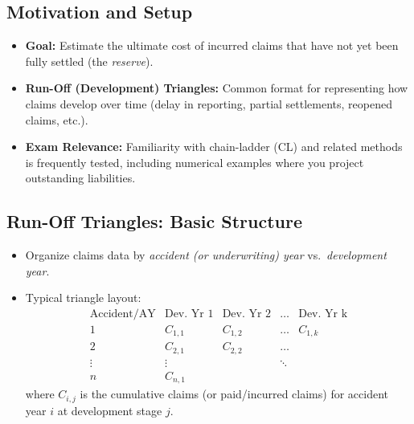 \documentclass[13pt,a4paper]{article}
\begin{document}
\subsection{Motivation and Setup}
\begin{itemize}
  \item \textbf{Goal:} Estimate the ultimate cost of incurred claims that have not yet been fully settled (the \emph{reserve}).
  \item \textbf{Run-Off (Development) Triangles:} Common format for representing how claims develop over time (delay in reporting, partial settlements, reopened claims, etc.).
  \item \textbf{Exam Relevance:} Familiarity with chain-ladder (CL) and related methods is frequently tested, including numerical examples where you project outstanding liabilities.
\end{itemize}

\subsection{Run-Off Triangles: Basic Structure}
\begin{itemize}
  \item Organize claims data by \emph{accident (or underwriting) year} vs.\ \emph{development year}.
  \item Typical triangle layout:
  \[
    \begin{array}{c|cccccc}
      \text{Accident/AY} & \text{Dev.\ Yr 1} & \text{Dev.\ Yr 2} & \dots & \text{Dev.\ Yr k}\\
      \hline
      1 & C_{1,1} & C_{1,2} & \dots & C_{1,k} \\
      2 & C_{2,1} & C_{2,2} & \dots & \\
      \vdots & \vdots &  & \ddots & \\
      n & C_{n,1} &  &  & 
    \end{array}
  \]
  where \(C_{i,j}\) is the cumulative claims (or paid/incurred claims) for accident year \(i\) at development stage \(j\).
\end{itemize}
\end{document}
